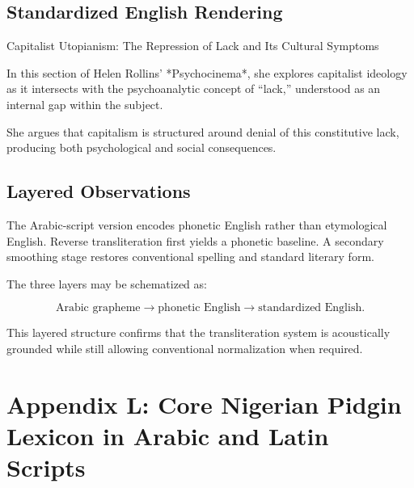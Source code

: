 \documentclass[12pt]{article}
\begin{document}
\subsection{Standardized English Rendering}

Capitalist Utopianism: The Repression of Lack and Its Cultural Symptoms

In this section of Helen Rollins’ *Psychocinema*, she explores capitalist ideology as it intersects with the psychoanalytic concept of “lack,” understood as an internal gap within the subject.

She argues that capitalism is structured around denial of this constitutive lack, producing both psychological and social consequences.

\subsection{Layered Observations}

The Arabic-script version encodes phonetic English rather than etymological English. Reverse transliteration first yields a phonetic baseline. A secondary smoothing stage restores conventional spelling and standard literary form.

The three layers may be schematized as:

\[
\text{Arabic grapheme} \rightarrow
\text{phonetic English} \rightarrow
\text{standardized English}.
\]

This layered structure confirms that the transliteration system is acoustically grounded while still allowing conventional normalization when required.
\section{Appendix L: Core Nigerian Pidgin Lexicon in Arabic and Latin Scripts}
\end{document}
